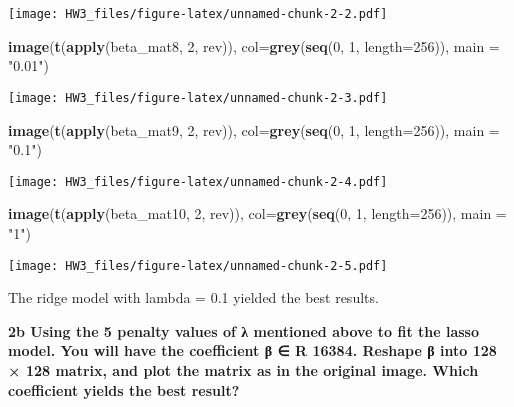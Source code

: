 \documentclass[
]{article}
\newenvironment{Shaded}{\begin{snugshade}}{\end{snugshade}}
\newcommand{\DataTypeTok}[1]{\textcolor[rgb]{0.13,0.29,0.53}{#1}}
\newcommand{\DecValTok}[1]{\textcolor[rgb]{0.00,0.00,0.81}{#1}}
\newcommand{\KeywordTok}[1]{\textcolor[rgb]{0.13,0.29,0.53}{\textbf{#1}}}
\newcommand{\NormalTok}[1]{#1}
\newcommand{\StringTok}[1]{\textcolor[rgb]{0.31,0.60,0.02}{#1}}
\begin{document}
\texttt{[image: HW3\_files/figure-latex/unnamed-chunk-2-2.pdf]}

\begin{Shaded}
\begin{Highlighting}[]
\KeywordTok{image}\NormalTok{(}\KeywordTok{t}\NormalTok{(}\KeywordTok{apply}\NormalTok{(beta_mat8, }\DecValTok{2}\NormalTok{, rev)), }\DataTypeTok{col=}\KeywordTok{grey}\NormalTok{(}\KeywordTok{seq}\NormalTok{(}\DecValTok{0}\NormalTok{, }\DecValTok{1}\NormalTok{, }\DataTypeTok{length=}\DecValTok{256}\NormalTok{)), }\DataTypeTok{main =} \StringTok{"0.01"}\NormalTok{)}
\end{Highlighting}
\end{Shaded}

\texttt{[image: HW3\_files/figure-latex/unnamed-chunk-2-3.pdf]}

\begin{Shaded}
\begin{Highlighting}[]
\KeywordTok{image}\NormalTok{(}\KeywordTok{t}\NormalTok{(}\KeywordTok{apply}\NormalTok{(beta_mat9, }\DecValTok{2}\NormalTok{, rev)), }\DataTypeTok{col=}\KeywordTok{grey}\NormalTok{(}\KeywordTok{seq}\NormalTok{(}\DecValTok{0}\NormalTok{, }\DecValTok{1}\NormalTok{, }\DataTypeTok{length=}\DecValTok{256}\NormalTok{)), }\DataTypeTok{main =} \StringTok{"0.1"}\NormalTok{)}
\end{Highlighting}
\end{Shaded}

\texttt{[image: HW3\_files/figure-latex/unnamed-chunk-2-4.pdf]}

\begin{Shaded}
\begin{Highlighting}[]
\KeywordTok{image}\NormalTok{(}\KeywordTok{t}\NormalTok{(}\KeywordTok{apply}\NormalTok{(beta_mat10, }\DecValTok{2}\NormalTok{, rev)), }\DataTypeTok{col=}\KeywordTok{grey}\NormalTok{(}\KeywordTok{seq}\NormalTok{(}\DecValTok{0}\NormalTok{, }\DecValTok{1}\NormalTok{, }\DataTypeTok{length=}\DecValTok{256}\NormalTok{)), }\DataTypeTok{main =} \StringTok{"1"}\NormalTok{)}
\end{Highlighting}
\end{Shaded}

\texttt{[image: HW3\_files/figure-latex/unnamed-chunk-2-5.pdf]}

The ridge model with lambda = 0.1 yielded the best results.

\textbf{2b Using the 5 penalty values of λ mentioned above to fit the
lasso model. You will have the coefficient β ∈ R 16384. Reshape β into
128 × 128 matrix, and plot the matrix as in the original image. Which
coefficient yields the best result? }
\end{document}
